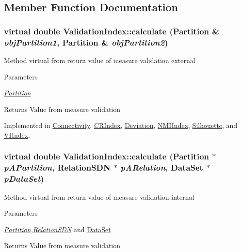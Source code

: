 \subsection{Member Function Documentation}
\hypertarget{classValidationIndex_a8b688d8d53fbdacec393730fe2bab614}{
\subsubsection[{calculate}]{\setlength{\rightskip}{0pt plus 5cm}virtual double ValidationIndex::calculate ({\bf Partition} \& {\em objPartition1}, \/  {\bf Partition} \& {\em objPartition2})}}
\label{classValidationIndex_a8b688d8d53fbdacec393730fe2bab614}
Method virtual from return value of measure validation external 
\begin{DoxyParams}{Parameters}
\item[{\em \hyperlink{classPartition}{Partition}}]\end{DoxyParams}
\begin{DoxyReturn}{Returns}
Value from measure validation 
\end{DoxyReturn}


Implemented in \hyperlink{classConnectivity_a5f211e2c2ff7d5f199a985c6f6e68556}{Connectivity}, \hyperlink{classCRIndex_acfcf9186a522c78d67cc977aeddaf193}{CRIndex}, \hyperlink{classDeviation_af722cf601ea21cc689a77c1de470bcb5}{Deviation}, \hyperlink{classNMIIndex_a3d2c254720bd825119d1cd7905daa50f}{NMIIndex}, \hyperlink{classSilhouette_aaf47b647b2409999209c58316ab8e980}{Silhouette}, and \hyperlink{classVIIndex_ab097798a95465469bda061fbb57bf101}{VIIndex}.\hypertarget{classValidationIndex_a26fe1244f3313bd7f557149f6846fe01}{
\subsubsection[{calculate}]{\setlength{\rightskip}{0pt plus 5cm}virtual double ValidationIndex::calculate ({\bf Partition} $\ast$ {\em pAPartition}, \/  {\bf RelationSDN} $\ast$ {\em pARelation}, \/  {\bf DataSet} $\ast$ {\em pDataSet})}}
\label{classValidationIndex_a26fe1244f3313bd7f557149f6846fe01}
Method virtual from return value of measure validation internal 
\begin{DoxyParams}{Parameters}
\item[{\em \hyperlink{classPartition}{Partition},\hyperlink{classRelationSDN}{RelationSDN}}]and \hyperlink{classDataSet}{DataSet} \end{DoxyParams}
\begin{DoxyReturn}{Returns}
Value from measure validation 
\end{DoxyReturn}



